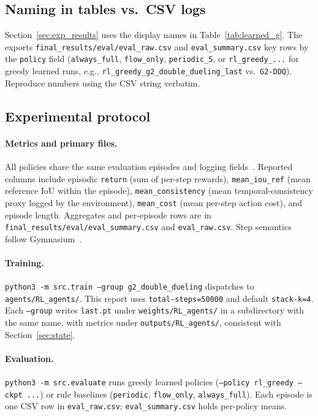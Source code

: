 \documentclass[letterpaper]{article}
\begin{document}
\subsection{Naming in tables vs.\ CSV logs}
Section~\ref{sec:exp_results} uses the display names in Table~\ref{tab:learned_g}. The exports \texttt{final\_results/eval/eval\_raw.csv} and \texttt{eval\_summary.csv} key rows by the \texttt{policy} field (\texttt{always\_full}, \texttt{flow\_only}, \texttt{periodic\_5}, or \texttt{rl\_greedy\_...} for greedy learned runs, e.g., \texttt{rl\_greedy\_g2\_double\_dueling\_last} vs.\ \texttt{G2-DDQ}). Reproduce numbers using the CSV string verbatim.

\subsection{Experimental protocol}
\paragraph{Metrics and primary files.}
All policies share the same evaluation episodes and logging fields~\cite{lealtaixe2015mot}. Reported columns include episodic \texttt{return} (sum of per-step rewards), \texttt{mean\_iou\_ref} (mean reference IoU within the episode), \texttt{mean\_consistency} (mean temporal-consistency proxy logged by the environment), \texttt{mean\_cost} (mean per-step action cost), and episode length. Aggregates and per-episode rows are in \texttt{final\_results/eval/eval\_summary.csv} and \texttt{eval\_raw.csv}. Step semantics follow Gymnasium~\cite{gymapi,gymstep}.

\paragraph{Training.}
\texttt{python3 -m src.train --group g2\_double\_dueling} dispatches to \texttt{agents/RL\_agents/}. This report uses \texttt{total-steps=50000} and default \texttt{stack-k=4}. Each \texttt{--group} writes \texttt{last.pt} under \texttt{weights/RL\_agents/} in a subdirectory with the same name, with metrics under \texttt{outputs/RL\_agents/}, consistent with Section~\ref{sec:state}.

\paragraph{Evaluation.}
\texttt{python3 -m src.evaluate} runs greedy learned policies (\texttt{--policy rl\_greedy --ckpt ...}) or rule baselines (\texttt{periodic}, \texttt{flow\_only}, \texttt{always\_full}). Each episode is one CSV row in \texttt{eval\_raw.csv}; \texttt{eval\_summary.csv} holds per-policy means.
\end{document}
